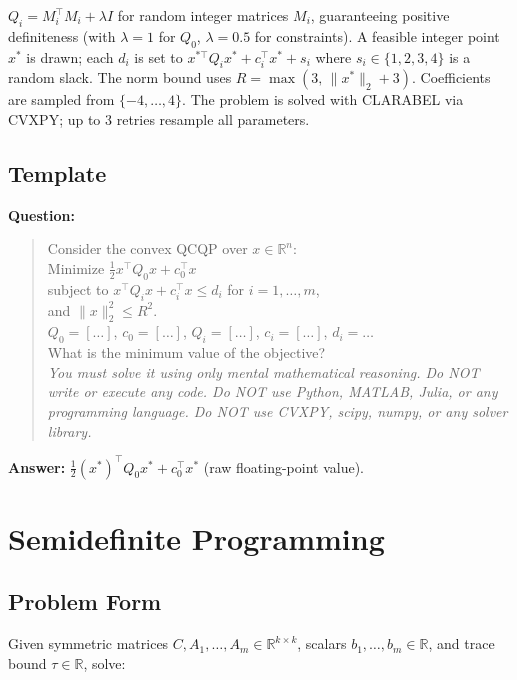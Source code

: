 \documentclass[12pt]{article}
\begin{document}
$Q_i = M_i^\top M_i + \lambda I$ for random integer matrices $M_i$,
guaranteeing positive definiteness (with $\lambda = 1$ for $Q_0$, $\lambda = 0.5$ for constraints).
A feasible integer point $x^*$ is drawn; each $d_i$ is set to
$x^{*\top} Q_i x^* + c_i^\top x^* + s_i$ where $s_i \in \{1,2,3,4\}$ is a random slack.
The norm bound uses $R = \max(3,\, \|x^*\|_2 + 3)$.
Coefficients are sampled from $\{-4, \ldots, 4\}$.
The problem is solved with CLARABEL via CVXPY; up to 3 retries resample all parameters.

\subsection{Template}

\vspace{6pt}
\noindent\textbf{Question:}
\begin{quote}
Consider the convex QCQP over $x \in \mathbb{R}^n$:\\
Minimize $\frac{1}{2} x^\top Q_0 x + c_0^\top x$\\
subject to $x^\top Q_i x + c_i^\top x \leq d_i$ for $i = 1, \ldots, m$,\\
and $\|x\|_2^2 \leq R^2$.\\[4pt]
$Q_0 = [\ldots]$, $c_0 = [\ldots]$, $Q_i = [\ldots]$, $c_i = [\ldots]$, $d_i = \ldots$\\[4pt]
What is the minimum value of the objective?\\[4pt]
\textit{You must solve it using only mental mathematical reasoning.
Do NOT write or execute any code.
Do NOT use Python, MATLAB, Julia, or any programming language.
Do NOT use CVXPY, scipy, numpy, or any solver library.}
\end{quote}

\noindent\textbf{Answer:} $\tfrac{1}{2}(x^*)^\top Q_0 x^* + c_0^\top x^*$ (raw floating-point value).

\section{Semidefinite Programming}

\subsection{Problem Form}

Given symmetric matrices $C, A_1, \ldots, A_m \in \mathbb{R}^{k \times k}$,
scalars $b_1, \ldots, b_m \in \mathbb{R}$, and trace bound $\tau \in \mathbb{R}$, solve:
\end{document}
